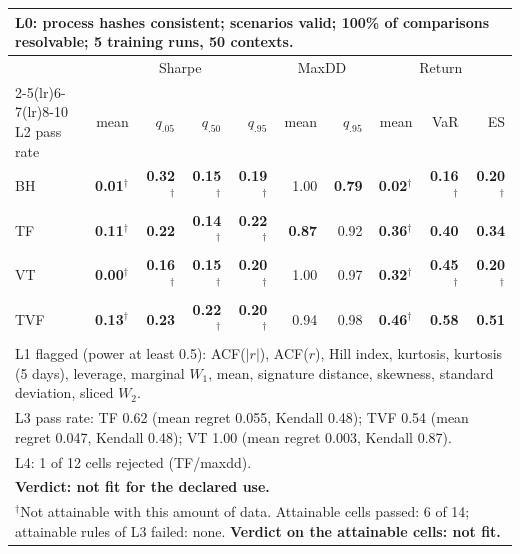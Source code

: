 \begin{tabular}{lrrrrrrrrr}
\toprule
\multicolumn{10}{p{13.5cm}}{L0: process hashes consistent; scenarios valid; 100\% of comparisons resolvable; 5 training runs, 50 contexts.} \\
\midrule
 & \multicolumn{4}{c}{Sharpe} & \multicolumn{2}{c}{MaxDD} & \multicolumn{3}{c}{Return} \\
\cmidrule(lr){2-5}\cmidrule(lr){6-7}\cmidrule(lr){8-10}
L2 pass rate & mean & $q_{.05}$ & $q_{.50}$ & $q_{.95}$ & mean & $q_{.95}$ & mean & VaR & ES \\
\midrule
BH & \textbf{0.01}$^{\dagger}$ & \textbf{0.32}$^{\dagger}$ & \textbf{0.15}$^{\dagger}$ & \textbf{0.19}$^{\dagger}$ & 1.00 & \textbf{0.79} & \textbf{0.02}$^{\dagger}$ & \textbf{0.16}$^{\dagger}$ & \textbf{0.20}$^{\dagger}$ \\
TF & \textbf{0.11}$^{\dagger}$ & \textbf{0.22} & \textbf{0.14}$^{\dagger}$ & \textbf{0.22}$^{\dagger}$ & \textbf{0.87} & 0.92 & \textbf{0.36}$^{\dagger}$ & \textbf{0.40} & \textbf{0.34} \\
VT & \textbf{0.00}$^{\dagger}$ & \textbf{0.16}$^{\dagger}$ & \textbf{0.15}$^{\dagger}$ & \textbf{0.20}$^{\dagger}$ & 1.00 & 0.97 & \textbf{0.32}$^{\dagger}$ & \textbf{0.45}$^{\dagger}$ & \textbf{0.20}$^{\dagger}$ \\
TVF & \textbf{0.13}$^{\dagger}$ & \textbf{0.23} & \textbf{0.22}$^{\dagger}$ & \textbf{0.20}$^{\dagger}$ & 0.94 & 0.98 & \textbf{0.46}$^{\dagger}$ & \textbf{0.58} & \textbf{0.51} \\
\midrule
\multicolumn{10}{p{13.5cm}}{L1 flagged (power at least 0.5): ACF($|r|$), ACF($r$), Hill index, kurtosis, kurtosis (5 days), leverage, marginal $W_1$, mean, signature distance, skewness, standard deviation, sliced $W_2$.} \\
\multicolumn{10}{p{13.5cm}}{L3 pass rate: TF 0.62 (mean regret 0.055, Kendall 0.48); TVF 0.54 (mean regret 0.047, Kendall 0.48); VT 1.00 (mean regret 0.003, Kendall 0.87).} \\
\multicolumn{10}{p{13.5cm}}{L4: 1 of 12 cells rejected (TF/maxdd).} \\
\multicolumn{10}{p{13.5cm}}{\textbf{Verdict: not fit for the declared use.}} \\
\multicolumn{10}{p{13.5cm}}{$^{\dagger}$Not attainable with this amount of data. Attainable cells passed: 6 of 14; attainable rules of L3 failed: none. \textbf{Verdict on the attainable cells: not fit.}} \\
\bottomrule
\end{tabular}
